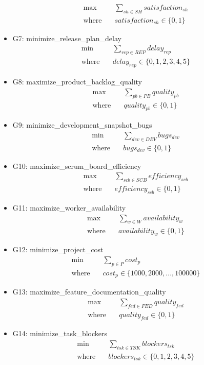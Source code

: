 \documentclass{article}
\begin{document}
\begin{itemize}
\begin{align*}
            \max \quad &\sum_{sh \in SH} satisfaction_{sh} \\
            \text{where} \quad &satisfaction_{sh} \in \{0, 1\}
        \end{align*}
    \item G7: minimize\_release\_plan\_delay
        \begin{align*}
            \min \quad &\sum_{rep \in REP} delay_{rep} \\
            \text{where} \quad &delay_{rep} \in \{0, 1, 2, 3, 4, 5\}
        \end{align*}
    \item G8: maximize\_product\_backlog\_quality
        \begin{align*}
            \max \quad &\sum_{pb \in PB} quality_{pb} \\
            \text{where} \quad &quality_{pb} \in \{0, 1\}
        \end{align*}
    \item G9: minimize\_development\_snapshot\_bugs
        \begin{align*}
            \min \quad &\sum_{dev \in DEV} bugs_{dev} \\
            \text{where} \quad &bugs_{dev} \in \{0, 1\}
        \end{align*}
    \item G10: maximize\_scrum\_board\_efficiency
        \begin{align*}
            \max \quad &\sum_{scb \in SCB} efficiency_{scb} \\
            \text{where} \quad &efficiency_{scb} \in \{0, 1\}
        \end{align*}
    \item G11: maximize\_worker\_availability
        \begin{align*}
            \max \quad &\sum_{w \in W} availability_{w} \\
            \text{where} \quad &availability_{w} \in \{0, 1\}
        \end{align*}
    \item G12: minimize\_project\_cost
        \begin{align*}
            \min \quad &\sum_{p \in P} cost_{p} \\
            \text{where} \quad &cost_{p} \in \{1000, 2000, ..., 100000\}
        \end{align*}
    \item G13: maximize\_feature\_documentation\_quality
        \begin{align*}
            \max \quad &\sum_{fed \in FED} quality_{fed} \\
            \text{where} \quad &quality_{fed} \in \{0, 1\}
        \end{align*}
    \item G14: minimize\_task\_blockers
        \begin{align*}
            \min \quad &\sum_{tsk \in TSK} blockers_{tsk} \\
            \text{where} \quad &blockers_{tsk} \in \{0, 1, 2, 3, 4, 5\}
        \end{align*}
\end{itemize}
\end{document}

